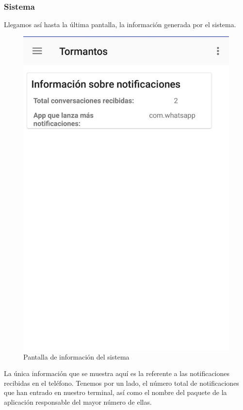 \documentclass[12pt,a4paper,oneside]{book} %
\begin{document}
\subsubsection{Sistema} 
Llegamos así hasta la última pantalla, la información generada por el sistema.
\begin{figure}[H]
	\begin{center}
     	\includegraphics[scale=0.2]{pictures/capsapp/system.png}
	    	\caption{Pantalla de información del sistema}
    	\label{fig:Pantalla de informacion del sistema}
	\end{center}
\end{figure}
La única información que se muestra aquí es la referente a las notificaciones recibidas en el teléfono. Tenemos por un lado, el número total de notificaciones que han entrado en nuestro terminal, así como el nombre del paquete de la aplicación responsable del mayor número de ellas.  
\end{document}
